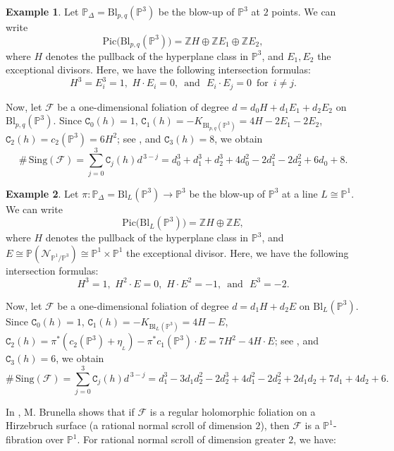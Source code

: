 \documentclass[11pt]{amsart}
\theoremstyle{plain}
\theoremstyle{definition}
\newtheorem{exe}{Example}[section]
\begin{document}
\begin{exe}
Let $\mathbb{P}_{\Delta}=\mathrm{Bl}_{p,q}(\mathbb{P}^3)$ be the blow-up of 
$\mathbb{P}^3$ at $2$ points. We can write 
$$\mathrm{Pic}\big(\mathrm{Bl}_{p,q}(\mathbb{P}^3)\big)=\mathbb{Z}H\oplus\mathbb{Z}E_1\oplus\mathbb{Z}E_2,$$ 
where $H$ denotes the pullback of the hyperplane class in $\mathbb{P}^3$, and $E_1,E_2$ the exceptional divisors. 
Here, we have the following intersection formulas: %
$$H^3=E_i^3=1,\,\,H\cdot E_i=0,\,\,\,\mbox{and}\,\,\,\,E_i\cdot E_j=0\,\,\,\mbox{for}\,\,\, i\neq j.$$

Now, let $\mathcal{F}$ be a one-dimensional foliation of degree $d=d_0H+d_1E_1+d_2E_2$ on $\mathrm{Bl}_{p,q}(\mathbb{P}^3)$.
Since 
$\texttt{C}_0(h)=1$, 
$\texttt{C}_1(h)=-K_{\mathrm{Bl}_{p,q}(\mathbb{P}^3)}=4H-2E_1-2E_2$, %
$\texttt{C}_2(h)=c_2(\mathbb{P}^3)=6H^2$; see \cite[p.609]{Grif}, 
and $\texttt{C}_3(h)=8$, %
we obtain 
$$\#\,\mathrm{Sing}(\mathcal{F})=\sum_{j=0}^3\texttt{C}_j(h)d^{\,3-j}=
d_0^3+d_1^3+d_2^3+4d_0^2-2d_1^2-2d_2^2+6d_0+8.$$
\end{exe}

\begin{exe}
Let $\pi:\mathbb{P}_{\Delta}=\mathrm{Bl}_L(\mathbb{P}^3)\rightarrow\mathbb{P}^3$ be the blow-up of 
$\mathbb{P}^3$ at a line $L\cong \mathbb{P}^1$. We can write 
$$\mathrm{Pic}\big(\mathrm{Bl}_L(\mathbb{P}^3)\big)=\mathbb{Z}H\oplus\mathbb{Z}E,$$ 
where $H$ denotes the pullback of the hyperplane class in $\mathbb{P}^3$, and 
$E\cong\mathbb{P}(\mathcal{N}_{\mathbb{P}^1/\mathbb{P}^3})\cong\mathbb{P}^1\times\mathbb{P}^1$ the exceptional divisor. 
Here, we have the following intersection formulas: 
$$H^3=1,\,\,H^2\cdot E=0,\,\,H\cdot E^2=-1,\,\,\,\mbox{and}\,\,\,\,E^3=-2.$$

Now, let $\mathcal{F}$ be a one-dimensional foliation of degree $d=d_1H+d_2E$ on $\mathrm{Bl}_L(\mathbb{P}^3)$.
Since 
$\texttt{C}_0(h)=1$, 
$\texttt{C}_1(h)=-K_{\mathrm{Bl}_L(\mathbb{P}^3)}=4H-E$, %
$\texttt{C}_2(h)=\pi^{\ast}(c_2(\mathbb{P}^3)+\eta_{_L})-\pi^{\ast}c_1(\mathbb{P}^3)\cdot E=7H^2-4H\cdot E$; see \cite[p.609]{Grif}, 
and $\texttt{C}_3(h)=6$, %
we obtain 
$$\#\,\mathrm{Sing}(\mathcal{F})=\sum_{j=0}^3\texttt{C}_j(h)d^{\,3-j}=
d_1^3-3d_1d_2^2-2d_2^3+4d_1^2-2d_2^2+2d_1d_2+7d_1+4d_2+6.$$
\end{exe}

\vspace{0,1cm}

In \cite[p.37]{Bru}, M. Brunella shows that if $\mathcal{F}$ is a regular holomorphic foliation on a Hirzebruch surface
(a rational normal scroll of dimension $2$), then $\mathcal{F}$ is a $\mathbb{P}^1$-fibration over $\mathbb{P}^1$.
For rational normal scroll of dimension greater $2$, we have: 
\end{document}
